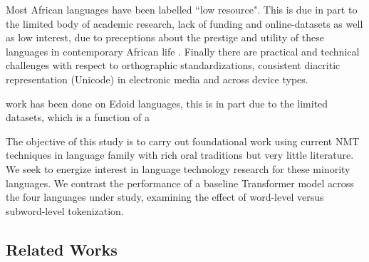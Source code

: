 \documentclass{article} %
\begin{document}
Most African languages have been labelled ``low resource". This is due in part to the limited body of academic research, lack of funding and online-datasets as well as low interest, due to preceptions about the prestige and utility of these languages in contemporary African life \cite{odojelanguage, awobuluyi201626}. Finally there are practical and technical challenges with respect to orthographic standardizations, consistent diacritic representation (Unicode) in electronic media and across device types. 

work has been done on Edoid languages, this is in part due to the limited datasets, which is a function of a 

The objective of this study is to carry out foundational work using current NMT techniques in language family with rich oral traditions but very little literature. We seek to energize interest in language technology research for these minority languages. We contrast the performance of a baseline Transformer model across the four languages under study, examining the effect of word-level versus subword-level tokenization.






\subsection{Related Works}
\end{document}
